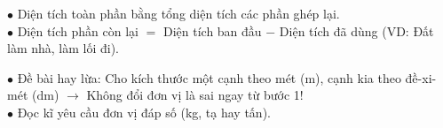 \documentclass[14pt,a4paper,oneside]{extbook}
\begin{document}
\vspace{3mm}

\noindent
\begin{minipage}[t]{0.54\textwidth}
  \begin{tcolorbox}[
    enhanced,
    title={\footnotesize\bfseries\color{white}\faLightbulbO\ Tính chất phân chia diện tích},
    colback=green!3!white,
    colframe=green!60!black,
    arc=2.5mm, boxrule=0.8pt, top=1.8mm, bottom=1.8mm, left=2.2mm, right=2.2mm
  ]
    \footnotesize
    $\bullet$ Diện tích toàn phần bằng tổng diện tích các phần ghép lại.\\
    $\bullet$ Diện tích phần còn lại $=$ Diện tích ban đầu $-$ Diện tích đã dùng (VD: Đất làm nhà, làm lối đi).
  \end{tcolorbox}
\end{minipage}%
\hfill
\begin{minipage}[t]{0.44\textwidth}
  \begin{tcolorbox}[
    enhanced,
    title={\footnotesize\bfseries\color{white}\faExclamationTriangle\ Mẹo tránh bẫy trắc nghiệm},
    colback=red!2!white,
    colframe=red!70!black,
    arc=2.5mm, boxrule=0.8pt, top=1.8mm, bottom=1.8mm, left=2.2mm, right=2.2mm
  ]
    \footnotesize
    $\bullet$ Đề bài hay lừa: Cho kích thước một cạnh theo mét ($\text{m}$), cạnh kia theo đề-xi-mét ($\text{dm}$) $\rightarrow$ Không đổi đơn vị là sai ngay từ bước 1!\\
    $\bullet$ Đọc kĩ yêu cầu đơn vị đáp số (kg, tạ hay tấn).
  \end{tcolorbox}
\end{minipage}
\end{document}
